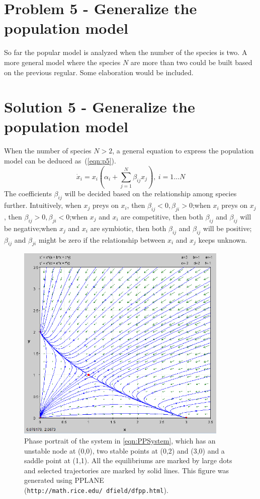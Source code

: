 \documentclass[a4paper,twocolumn]{article} %
\begin{document}
\section{Problem 5 - Generalize the population model}
\label{sec:prob5} 
So far the popular model is analyzed when the number of the species is two. A more general model where the species $N$ are more than two could be built based on the previous regular. Some elaboration would be included. 

\section{Solution 5 - Generalize the population model}
\label{sec:solu5}
When the number of species $N>2$, a general equation to express the population model can be deduced as~(\ref{eqn:p5}).
\begin{equation}\label{eqn:p5}
   \dot{x}_i = x_i(\alpha_i+ \sum_{j=1}^{N} \beta_{ij}x_j), ~i=1...N
\end{equation}
The coefficients $\beta_{ij}$ will be decided based on the relationship among species further. Intuitively, when $x_j$ preys on $x_i$, then $\beta_{ij}<0, \beta_{ji}>0$;when $x_i$ preys on $x_j$, then $\beta_{ij}>0, \beta_{ji}<0$;when $x_j$ and $x_i$ are competitive, then both $\beta_{ij}$ and $\beta_{ij}$ will be negative;when $x_j$ and $x_i$ are symbiotic, then both $\beta_{ij}$ and $\beta_{ij}$ will be positive;$\beta_{ij}$ and $\beta_{ji}$ might be zero if the relationship between $x_i$ and $x_j$ keeps unknown. 

\begin{figure}[p] %
  \begin{center}
    \includegraphics[width = 0.9\textwidth, height = 0.5\textwidth]{-2-1}
  \end{center}
  \caption{Phase portrait of the system in \eqref{eqn:PPSystem}, which has an unstable node at \mbox{(0,0)}, two stable points at \mbox{(0,2)} and \mbox{(3,0)} and a saddle point at \mbox{(1,1)}. All the equilibriums are marked by large dots and selected trajectories are marked by solid lines. This figure was generated using PPLANE (\texttt{http://math.rice.edu/~dfield/dfpp.html}).}
  \label{fig:pplane}
\end{figure}
\end{document}
